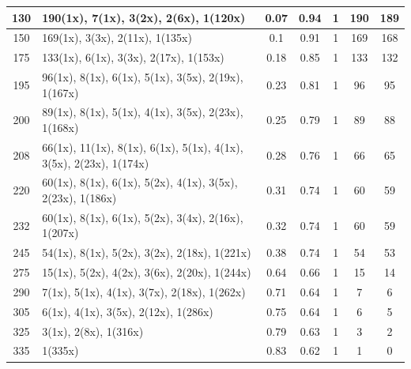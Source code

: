 \begin{small}
\begin{longtable}{|c|p{4cm}|c|c|c|c|c|}
130 & 190(1x), 7(1x), 3(2x), 2(6x), 1(120x) & \cellcolor{colorGood}  0.07 & \cellcolor{colorGood} 0.94 & 1 & 190 & \cellcolor{colorBad} 189 \\   \hline
150 & 169(1x), 3(3x), 2(11x), 1(135x) & \cellcolor{colorGood}  0.1 & \cellcolor{colorGood} 0.91 & 1 & 169 & \cellcolor{colorBad} 168 \\   \hline
175 & 133(1x), 6(1x), 3(3x), 2(17x), 1(153x) & \cellcolor{colorGood}  0.18 & \cellcolor{colorGood} 0.85 & 1 & 133 & \cellcolor{colorBad} 132 \\   \hline
195 & 96(1x), 8(1x), 6(1x), 5(1x), 3(5x), 2(19x), 1(167x) & \cellcolor{colorGood}  0.23 & \cellcolor{colorGood} 0.81 & 1 & 96 & \cellcolor{colorBad} 95 \\   \hline
200 & 89(1x), 8(1x), 5(1x), 4(1x), 3(5x), 2(23x), 1(168x) & \cellcolor{colorGood}  0.25 & \cellcolor{colorGood} 0.79 & 1 & 89 & \cellcolor{colorBad} 88 \\   \hline
208 & 66(1x), 11(1x), 8(1x), 6(1x), 5(1x), 4(1x), 3(5x), 2(23x), 1(174x) & \cellcolor{colorGood}  0.28 & \cellcolor{colorGood} 0.76 & 1 & 66 & \cellcolor{colorBad} 65 \\   \hline
220 & 60(1x), 8(1x), 6(1x), 5(2x), 4(1x), 3(5x), 2(23x), 1(186x) & \cellcolor{colorGood}  0.31 & \cellcolor{colorGood} 0.74 & 1 & 60 & \cellcolor{colorBad} 59 \\   \hline
232 & 60(1x), 8(1x), 6(1x), 5(2x), 3(4x), 2(16x), 1(207x) & \cellcolor{colorGood}  0.32 & \cellcolor{colorGood} 0.74 & 1 & 60 & \cellcolor{colorBad} 59 \\   \hline
245 & 54(1x), 8(1x), 5(2x), 3(2x), 2(18x), 1(221x) & \cellcolor{colorGood}  0.38 & \cellcolor{colorGood} 0.74 & 1 & 54 & \cellcolor{colorBad} 53 \\   \hline
275 & 15(1x), 5(2x), 4(2x), 3(6x), 2(20x), 1(244x) & \cellcolor{colorOK}  0.64 & \cellcolor{colorOK} 0.66 & 1 & 15 & \cellcolor{colorBad} 14 \\   \hline
290 & 7(1x), 5(1x), 4(1x), 3(7x), 2(18x), 1(262x) & \cellcolor{colorBad}  0.71 & \cellcolor{colorBad} 0.64 & 1 & 7 & \cellcolor{colorGood} 6 \\   \hline
305 & 6(1x), 4(1x), 3(5x), 2(12x), 1(286x) & \cellcolor{colorBad}  0.75 & \cellcolor{colorBad} 0.64 & 1 & 6 & \cellcolor{colorGood} 5 \\   \hline
325 & 3(1x), 2(8x), 1(316x) & \cellcolor{colorBad}  0.79 & \cellcolor{colorBad} 0.63 & 1 & 3 & \cellcolor{colorGood} 2 \\   \hline
335 & 1(335x) & \cellcolor{colorBad}  0.83 & \cellcolor{colorBad} 0.62 & 1 & 1 & \cellcolor{colorGood} 0 \\   \hline
	
\end{longtable}
\end{small}
\endgroup

